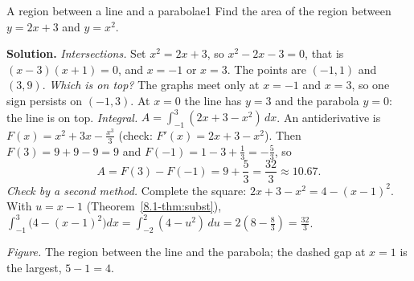 \documentclass[11pt]{article}
\begin{document}
\begin{exmp}{A region between a line and a parabola}{e1}
Find the area of the region between $y=2x+3$ and $y=x^2$.

\textbf{Solution.} \emph{Intersections.} Set $x^2=2x+3$, so $x^2-2x-3=0$, that is $(x-3)(x+1)=0$, and $x=-1$ or $x=3$. The points are $(-1,1)$ and $(3,9)$.
\emph{Which is on top?} The graphs meet only at $x=-1$ and $x=3$, so one sign persists on $(-1,3)$. At $x=0$ the line has $y=3$ and the parabola $y=0$: the line is on top.
\emph{Integral.} $A=\int_{-1}^{3}(2x+3-x^2)\,dx$. An antiderivative is $F(x)=x^2+3x-\frac{x^3}3$ (check: $F'(x)=2x+3-x^2$). Then $F(3)=9+9-9=9$ and $F(-1)=1-3+\frac13=-\frac53$, so
\[
A=F(3)-F(-1)=9+\frac53=\frac{32}3\approx10.67 .
\]
\emph{Check by a second method.} Complete the square: $2x+3-x^2=4-(x-1)^2$. With $u=x-1$ (Theorem~\ref{8.1-thm:subst}), $\int_{-1}^3\bigl(4-(x-1)^2\bigr)dx=\int_{-2}^{2}(4-u^2)\,du=2\left(8-\frac83\right)=\frac{32}3$. \checkmark

\begin{center}
\par\small\emph{Figure.} The region between the line and the parabola; the dashed gap at $x=1$ is the largest, $5-1=4$.
\end{center}
\end{exmp}
\end{document}
